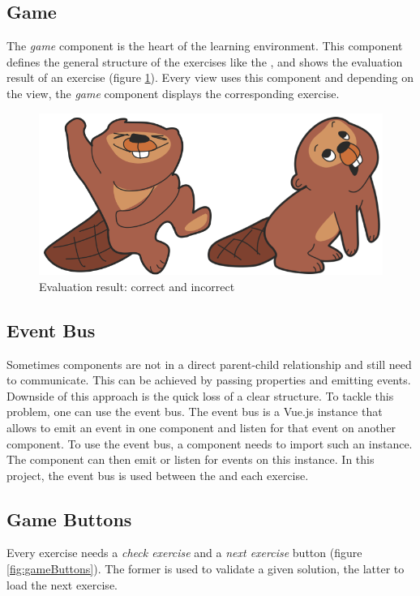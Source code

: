 \subsection*{Game}
The \textit{game} component is the heart of the learning environment. This component defines the general structure of the exercises like the ,  and shows the evaluation result of an exercise (figure \ref{fig:evaluationResult}). Every view uses this component and depending on the view, the \textit{game} component displays the corresponding exercise.

\begin{figure}[h]
    \centering
    \includegraphics[width=0.5\columnwidth]{figures/evaluation_result.png}
    \caption{Evaluation result: correct and incorrect}
    \label{fig:evaluationResult} 
\end{figure}

\subsection*{Event Bus}
Sometimes components are not in a direct parent-child relationship and still need to communicate. This can be achieved by passing properties and emitting events. Downside of this approach is the quick loss of a clear structure. To tackle this problem, one can use the event bus. 
The event bus is a Vue.js instance that allows to emit an event in one component and listen for that event on another component. To use the event bus, a component needs to import such an instance. The component can then emit or listen for events on this instance. In this project, the event bus is used between the  and each exercise.

\subsection*{Game Buttons}
\label{subsection:gameButtons}
Every exercise needs a \textit{check exercise} and a \textit{next exercise} button (figure \ref{fig:gameButtons}). The former is used to validate a given solution, the latter to load the next exercise.

